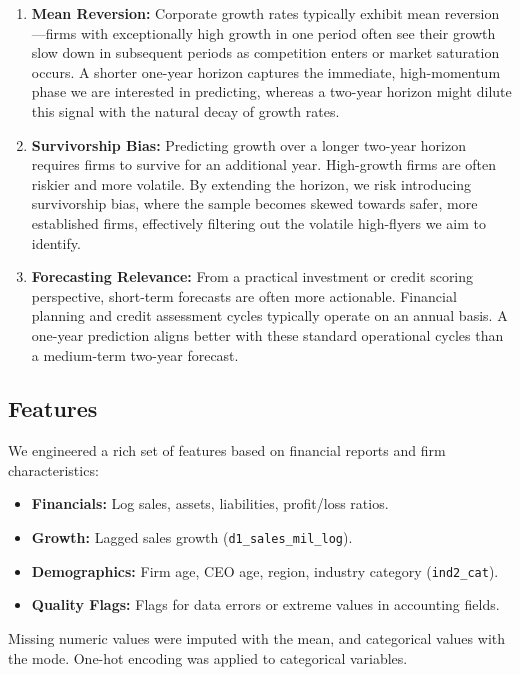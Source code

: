 \documentclass[11pt,a4paper]{article}
\begin{document}
\begin{enumerate}
    \item \textbf{Mean Reversion:} Corporate growth rates typically exhibit mean reversion—firms with exceptionally high growth in one period often see their growth slow down in subsequent periods as competition enters or market saturation occurs. A shorter one-year horizon captures the immediate, high-momentum phase we are interested in predicting, whereas a two-year horizon might dilute this signal with the natural decay of growth rates.
    
    \item \textbf{Survivorship Bias:} Predicting growth over a longer two-year horizon requires firms to survive for an additional year. High-growth firms are often riskier and more volatile. By extending the horizon, we risk introducing survivorship bias, where the sample becomes skewed towards safer, more established firms, effectively filtering out the volatile high-flyers we aim to identify.
    
    \item \textbf{Forecasting Relevance:} From a practical investment or credit scoring perspective, short-term forecasts are often more actionable. Financial planning and credit assessment cycles typically operate on an annual basis. A one-year prediction aligns better with these standard operational cycles than a medium-term two-year forecast.
\end{enumerate}

\subsection{Features}
We engineered a rich set of features based on financial reports and firm characteristics:
\begin{itemize}
    \item \textbf{Financials:} Log sales, assets, liabilities, profit/loss ratios.
    \item \textbf{Growth:} Lagged sales growth (\texttt{d1\_sales\_mil\_log}).
    \item \textbf{Demographics:} Firm age, CEO age, region, industry category (\texttt{ind2\_cat}).
    \item \textbf{Quality Flags:} Flags for data errors or extreme values in accounting fields.
\end{itemize}
Missing numeric values were imputed with the mean, and categorical values with the mode. One-hot encoding was applied to categorical variables.
\end{document}
